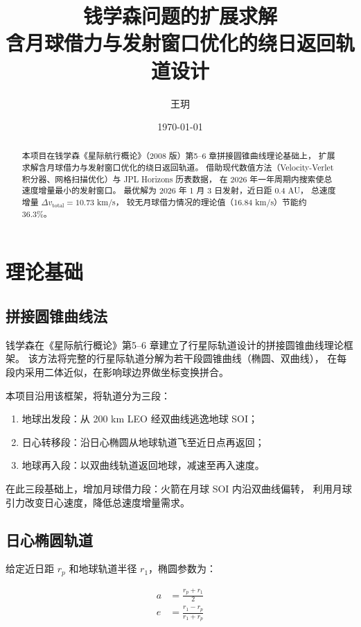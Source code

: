 \documentclass[12pt,a4paper]{ctexart}
\title{钱学森问题的扩展求解 \\
\large 含月球借力与发射窗口优化的绕日返回轨道设计}
\author{王玥 \quad 3240101488}
\date{\today}
\begin{document}
\maketitle

\begin{abstract}
本项目在钱学森《星际航行概论》（2008 版）第5--6 章拼接圆锥曲线理论基础上，
扩展求解含月球借力与发射窗口优化的绕日返回轨道。
借助现代数值方法（Velocity-Verlet 积分器、网格扫描优化）与 JPL Horizons 历表数据，
在 2026 年一年周期内搜索使总速度增量最小的发射窗口。
最优解为 2026 年 1 月 3 日发射，近日距 0.4 AU，
总速度增量 $\Delta v_{\text{total}} = 10.73$ km/s，
较无月球借力情况的理论值（16.84 km/s）节能约 36.3\%。
\end{abstract}

\tableofcontents

\section{理论基础}

\subsection{拼接圆锥曲线法}

钱学森在《星际航行概论》第5--6 章建立了行星际轨道设计的拼接圆锥曲线理论框架。
该方法将完整的行星际轨道分解为若干段圆锥曲线（椭圆、双曲线），
在每段内采用二体近似，在影响球边界做坐标变换拼合。

本项目沿用该框架，将轨道分为三段：
\begin{enumerate}
\item 地球出发段：从 200 km LEO 经双曲线逃逸地球 SOI；
\item 日心转移段：沿日心椭圆从地球轨道飞至近日点再返回；
\item 地球再入段：以双曲线轨道返回地球，减速至再入速度。
\end{enumerate}
在此三段基础上，增加月球借力段：火箭在月球 SOI 内沿双曲线偏转，
利用月球引力改变日心速度，降低总速度增量需求。

\subsection{日心椭圆轨道}

给定近日距 $r_p$ 和地球轨道半径 $r_1$，椭圆参数为：

\begin{align}
a &= \frac{r_p + r_1}{2} \label{eq:a} \\
e &= \frac{r_1 - r_p}{r_1 + r_p} \label{eq:e}
\end{align}
\end{document}
